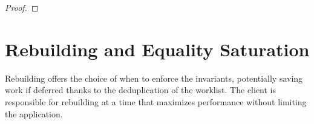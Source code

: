 \begin{proof}
\end{proof}

\section{Rebuilding and Equality Saturation}
\label{sec:rebuilding-eqsat}

Rebuilding offers the choice of when to enforce the \egraph invariants,
  potentially saving work if deferred thanks to the deduplication of the
  worklist.
The client is responsible for rebuilding at a time that
  maximizes performance without limiting the application.

